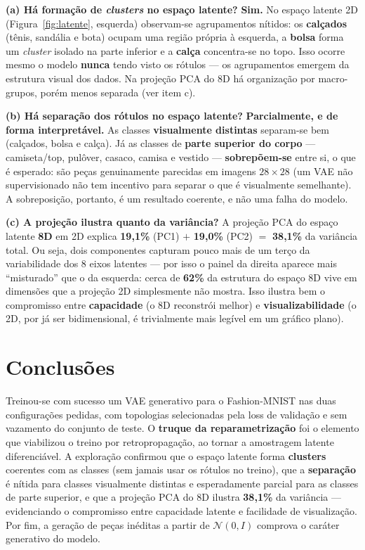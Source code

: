 \documentclass[11pt,a4paper]{article}
\begin{document}
\textbf{(a) Há formação de \textit{clusters} no espaço latente?}
\textbf{Sim.} No espaço latente 2D (Figura~\ref{fig:latente}, esquerda) observam-se agrupamentos nítidos: os \textbf{calçados} (tênis, sandália e bota) ocupam uma região própria à esquerda, a \textbf{bolsa} forma um \textit{cluster} isolado na parte inferior e a \textbf{calça} concentra-se no topo. Isso ocorre mesmo o modelo \textbf{nunca} tendo visto os rótulos --- os agrupamentos emergem da estrutura visual dos dados. Na projeção PCA do 8D há organização por macro-grupos, porém menos separada (ver item c).

\textbf{(b) Há separação dos rótulos no espaço latente?}
\textbf{Parcialmente, e de forma interpretável.} As classes \textbf{visualmente distintas} separam-se bem (calçados, bolsa e calça). Já as classes de \textbf{parte superior do corpo} --- camiseta/top, pulôver, casaco, camisa e vestido --- \textbf{sobrepõem-se} entre si, o que é esperado: são peças genuinamente parecidas em imagens $28\times28$ (um VAE não supervisionado não tem incentivo para separar o que é visualmente semelhante). A sobreposição, portanto, é um resultado coerente, e não uma falha do modelo.

\textbf{(c) A projeção ilustra quanto da variância?}
A projeção PCA do espaço latente \textbf{8D} em 2D explica \textbf{19{,}1\%} (PC1) $+$ \textbf{19{,}0\%} (PC2) $=$ \textbf{38{,}1\%} da variância total. Ou seja, dois componentes capturam pouco mais de um terço da variabilidade dos 8 eixos latentes --- por isso o painel da direita aparece mais ``misturado'' que o da esquerda: cerca de \textbf{62\%} da estrutura do espaço 8D vive em dimensões que a projeção 2D simplesmente não mostra. Isso ilustra bem o compromisso entre \textbf{capacidade} (o 8D reconstrói melhor) e \textbf{visualizabilidade} (o 2D, por já ser bidimensional, é trivialmente mais legível em um gráfico plano).

\section{Conclusões}

Treinou-se com sucesso um VAE generativo para o Fashion-MNIST nas duas configurações pedidas, com topologias selecionadas pela loss de validação e sem vazamento do conjunto de teste. O \textbf{truque da reparametrização} foi o elemento que viabilizou o treino por retropropagação, ao tornar a amostragem latente diferenciável. A exploração confirmou que o espaço latente forma \textbf{clusters} coerentes com as classes (sem jamais usar os rótulos no treino), que a \textbf{separação} é nítida para classes visualmente distintas e esperadamente parcial para as classes de parte superior, e que a projeção PCA do 8D ilustra \textbf{38{,}1\%} da variância --- evidenciando o compromisso entre capacidade latente e facilidade de visualização. Por fim, a geração de peças inéditas a partir de $\mathcal{N}(0, I)$ comprova o caráter generativo do modelo.
\end{document}
